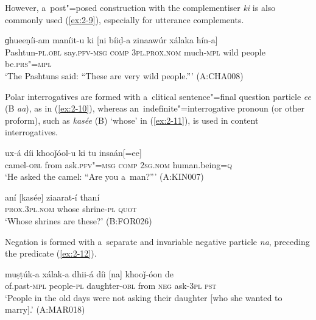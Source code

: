 However, a~post"=posed construction with the complementiser \textit{ki} is also commonly used (\ref{ex:2-9}), especially for utterance complements.

\begin{exe}
\ex
\label{ex:2-9}
\gll ɡhueeṇíi-am maníit-u ki [ni bíiḍ-a zinaawúr xálaka hín-a] \\
	Pashtun-\textsc{pl.obl} say.\textsc{pfv-msg} \textsc{comp} \textsc{3pl.prox.nom} much-\textsc{mpl} wild people be.\textsc{prs"=mpl} \\
\glt `The Pashtuns said: ``These are very wild people.''' (A:CHA008)
\end{exe}

Polar interrogatives are formed with a~clitical sentence"=final question particle \textit{ee} (B \textit{aa}), as in (\ref{ex:2-10}), whereas an~indefinite"=interrogative pronoun (or other proform), such as \textit{kasée} (B) `whose' in (\ref{ex:2-11}), is used in content interrogatives. 

\begin{exe}
\ex
\label{ex:2-10}
\gll ux-á díi khooǰóol-u ki tu insaán[=ee] \\
	camel-\textsc{obl} from ask.\textsc{pfv"=msg} \textsc{comp} \textsc{2sg.nom} human.being=\textsc{q} \\
\glt `He asked the camel: ``Are you a~man?''' (A:KIN007)
\end{exe}


\begin{exe}
\ex
\label{ex:2-11}
\gll aní [kasée] ziaarat-í thaní \\
	\textsc{prox.3pl.nom} whose shrine-\textsc{pl} \textsc{quot} \\
\glt `Whose shrines are these?' (B:FOR026)
\end{exe}

Negation is formed with a~separate and invariable negative particle \textit{na}, preceding the predicate (\ref{ex:2-12}).

\begin{exe}
\ex
\label{ex:2-12}
\gll muṣṭúk-a xálak-a dhii-á díi [na] khooǰ-óon de \\
	of.past-\textsc{mpl} people-\textsc{pl} daughter-\textsc{obl} from \textsc{neg} ask-\textsc{3pl} \textsc{pst} \\
\glt `People in the old days were not asking their daughter [who she wanted to marry].' (A:MAR018)
\end{exe}